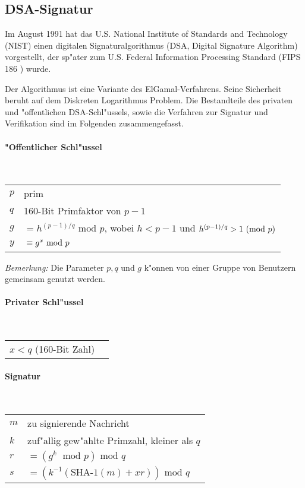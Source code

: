 \subsection{DSA-Signatur}

Im August 1991 hat das U.S. National Institute of Standards and Technology
(NIST) einen digitalen Signaturalgorithmus (DSA, Digital Signature
Algorithm) vorgestellt, der sp"ater zum U.S. Federal Information Processing
Standard (FIPS 186 \cite{FIPS186}) wurde.

Der Algorithmus ist eine Variante des ElGamal-Verfahrens. Seine Sicherheit
beruht auf dem Diskreten Logarithmus
Problem. Die Bestandteile des privaten
und "offentlichen DSA-Schl"ussels, sowie die Verfahren zur Signatur und
Verifikation sind im Folgenden zusammengefasst.


\paragraph{"Offentlicher Schl"ussel}\strut\\
\begin{tabular}{l@{ }l}
$p$ & prim \\
$q$ & 160-Bit Primfaktor von $p - 1$ \\
$g$ & $ = h^{(p-1)/q}  \mbox{ mod } p$, wobei $h < p - 1$ und
$h^{(p-1)/q} > 1  \ (\mbox{mod }p)$ \\
$y$ & $\strut \equiv  g^x  \mbox{ mod } p$ 
\end{tabular}

\emph{Bemerkung:} Die Parameter $p,q$ und $g$ k"onnen von einer Gruppe von
Benutzern gemeinsam genutzt werden.

\paragraph{Privater Schl"ussel}\strut\\
\begin{tabular}{l@{ }l}
$x < q$ (160-Bit Zahl) 
\end{tabular}

\paragraph{Signatur}\strut\\
\begin{tabular}{l@{ }l}
$m$ & zu signierende Nachricht\\
$k$ & zuf"allig\index{Zufall} gew"ahlte Primzahl, kleiner als $q$\\
$r$ & $= (g^k \; \mbox{ mod } p) \mbox{ mod } q$\\
$s$ & $= (k^{-1}(\mbox{SHA-1}(m) + xr)) \mbox{ mod } q$
\end{tabular}

